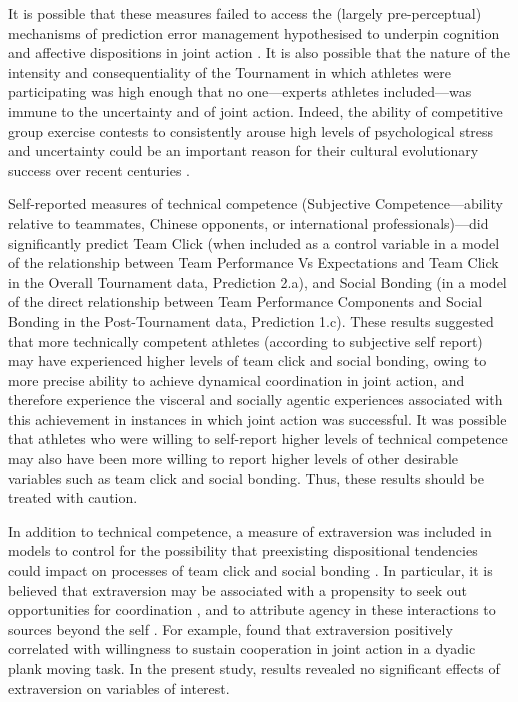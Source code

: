 \begin{CJK}{UTF8}{gbsn}
It is possible that these measures failed to access the (largely pre-perceptual) mechanisms of prediction error management hypothesised to underpin cognition and affective dispositions in joint action \citep{Clark2013}.  It is also possible that the nature of the intensity and consequentiality of the Tournament in which athletes were participating was high enough that no one---experts athletes included---was immune to the uncertainty and of joint action.  Indeed, the ability of competitive group exercise contests to consistently arouse high levels of psychological stress and uncertainty could be an important reason for their cultural evolutionary success over recent centuries \citep{Dunbar2010,Whitehouse2004}.

Self-reported measures of technical competence (Subjective Competence---ability relative to teammates, Chinese opponents, or international professionals)—did significantly
predict Team Click (when included as a control variable in a model of the relationship between Team Performance Vs Expectations and Team Click in the Overall Tournament data, Prediction 2.a), and Social Bonding (in a model of the direct relationship between Team Performance Components and Social Bonding in the Post-Tournament data, Prediction 1.c).  These results suggested that more technically competent athletes (according to subjective self report) may have experienced higher levels of team click and social bonding, owing to more precise ability to achieve dynamical coordination in joint action, and therefore experience the visceral and socially agentic experiences associated with this achievement in instances in which joint action was successful.  It was possible that athletes who were willing to self-report higher levels of technical competence may also have been more willing to report higher levels of other desirable variables such as team click and social bonding. Thus, these results should be treated with caution.

In addition to technical competence, a measure of extraversion was included in models to control for the possibility that preexisting dispositional tendencies could impact on processes of team click and social bonding \citep{Marsh2009,VonRueden2015}.  In particular, it is believed that extraversion may be associated with a propensity to seek out opportunities for coordination \citep{Richardson2007a}, and to attribute agency in these interactions to sources beyond the self \citep[also known as external locus of control; see][]{Morris1981}. For example, \textcite{Richardson2007a} found that extraversion positively correlated with willingness to sustain cooperation in joint action in a dyadic plank moving task.  In the present study, results revealed no significant effects of extraversion on variables of interest.


\end{CJK}
